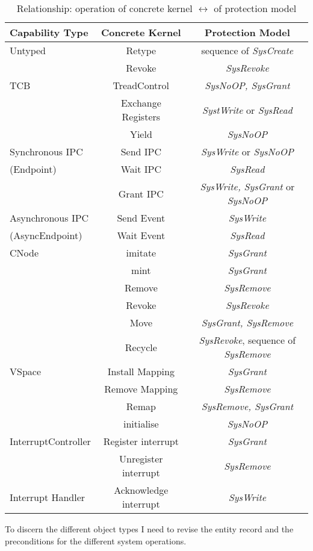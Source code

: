 \begin{table}[H]
\begin{tabular}{|l|c|c|}
\hline
Capability Type & Concrete Kernel & Protection Model \\
\hline
\hline
Untyped & Retype & sequence of \textit{SysCreate} \\
& Revoke & \textit{SysRevoke} \\
\hline
TCB & TreadControl & \textit{SysNoOP, SysGrant} \\
& Exchange Registers & \textit{SystWrite} or \textit{SysRead} \\
& Yield & \textit{SysNoOP} \\
\hline
Synchronous IPC & Send IPC & \textit{SysWrite} or \textit{SysNoOP} \\
(Endpoint) & Wait IPC & \textit{SysRead} \\
& Grant IPC & \textit{SysWrite, SysGrant} or \textit{SysNoOP} \\
\hline
Asynchronous IPC & Send Event & \textit{SysWrite} \\
(AsyncEndpoint) & Wait Event & \textit{SysRead} \\
\hline
CNode & imitate & \textit{SysGrant} \\
& mint & \textit{SysGrant} \\
& Remove & \textit{SysRemove} \\
& Revoke & \textit{SysRevoke} \\
& Move & \textit{SysGrant, SysRemove} \\
& Recycle & \textit{SysRevoke}, sequence of \textit{SysRemove} \\
\hline
VSpace & Install Mapping & \textit{SysGrant} \\
& Remove Mapping & \textit{SysRemove} \\
& Remap & \textit{SysRemove, SysGrant} \\
& initialise & \textit{SysNoOP} \\
\hline
InterruptController & Register interrupt & \textit{SysGrant} \\
& Unregister interrupt &  \textit{SysRemove}\\
\hline
Interrupt Handler & Acknowledge interrupt & \textit{SysWrite}\\
\hline
\end{tabular}
\caption{Relationship: operation of concrete kernel $\longleftrightarrow$ of protection model \cite{PhDseL4}} \end{table}
To discern the different object types I need to revise the entity record and the preconditions for the different system operations. \\ \\ 
